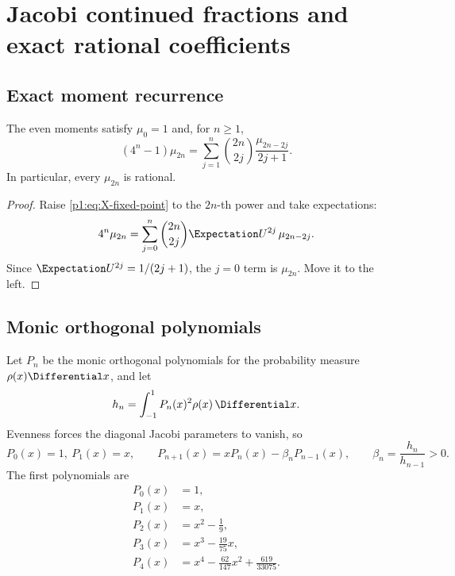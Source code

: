 \documentclass[11pt]{article}
\theoremstyle{definition}
\theoremstyle{remark}
\begin{document}
\section{Jacobi continued fractions and exact rational coefficients}\label{p1:sec:jacobi}

\subsection{Exact moment recurrence}

\begin{proposition}\label{p1:prop:moment-recurrence}
The even moments satisfy \(\mu_0=1\) and, for \(n\ge1\),
\begin{equation}
 \boxed{
 (4^n-1)\mu_{2n}
 =\sum_{j=1}^{n}\binom{2n}{2j}\frac{\mu_{2n-2j}}{2j+1}.
 }                                                           \label{p1:eq:moment-recurrence}
\end{equation}
In particular, every \(\mu_{2n}\) is rational.
\end{proposition}

\begin{proof}
Raise \eqref{p1:eq:X-fixed-point} to the \(2n\)-th power and take expectations:
\[
 4^n\mu_{2n}
 =\sum_{j=0}^{n}\binom{2n}{2j}\Expectation U^{2j}\,\mu_{2n-2j}.
\]
Since \(\Expectation U^{2j}=1/(2j+1)\), the \(j=0\) term is \(\mu_{2n}\).  Move it to the left.
\end{proof}

\subsection{Monic orthogonal polynomials}

Let \(P_n\) be the monic orthogonal polynomials for the probability measure
\(\rho(x)\Differential x\), and let
\begin{equation}
 h_n=\int_{-1}^{1}P_n(x)^2\rho(x)\,\Differential x.                    \label{p1:eq:hn}
\end{equation}
Evenness forces the diagonal Jacobi parameters to vanish, so
\begin{equation}
 P_0(x)=1,\
 P_1(x)=x,
 \qquad
 P_{n+1}(x)=xP_n(x)-\beta_nP_{n-1}(x),
 \qquad
 \beta_n=\frac{h_n}{h_{n-1}}>0.                              \label{p1:eq:monic-recurrence}
\end{equation}
The first polynomials are
\begin{align}
 P_0(x)&=1,\\
 P_1(x)&=x,\\
 P_2(x)&=x^2-\frac19,\\
 P_3(x)&=x^3-\frac{19}{75}x,\\
 P_4(x)&=x^4-\frac{62}{147}x^2+\frac{619}{33075}.
\end{align}
\end{document}

